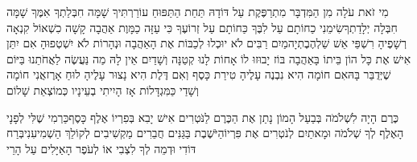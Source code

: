 \documentclass[../main/main.tex]{subfiles}
\begin{document}
\begin{multicols*}{\ncols}
מִי זֹאת עֹלָה מִן הַמִּדְבָּר מִתְרַפֶּקֶת עַל דּוֹדָהּ תַּחַת הַתַּפּוּחַ עוֹרַרְתִּיךָ שָׁמָּה חִבְּלַתְךָ אִמֶּךָ שָׁמָּה חִבְּלָה יְלָדַתְךָ\PreVerseSpace{}שִׂימֵנִי כַחוֹתָם עַל לִבֶּךָ כַּחוֹתָם עַל זְרוֹעֶךָ כִּי עַזָּה כַמָּוֶת אַהֲבָה קָשָׁה כִשְׁאוֹל קִנְאָה רְשָׁפֶיהָ רִשְׁפֵּי אֵשׁ שַׁלְהֶבֶתְיָה\PreVerseSpace{}מַיִם רַבִּים לֹא יוּכְלוּ לְכַבּוֹת אֶת הָאַהֲבָה וּנְהָרוֹת לֹא יִשְׁטְפוּהָ אִם יִתֵּן אִישׁ אֶת כָּל הוֹן בֵּיתוֹ בָּאַהֲבָה בּוֹז יָבוּזוּ לוֹ \ClosedSection{}אָחוֹת לָנוּ קְטַנָּה וְשָׁדַיִם אֵין לָהּ מַה נַּעֲשֶׂה לַאֲחֹתֵנוּ בַּיּוֹם שֶׁיְּדֻבַּר בָּהּ\PreVerseSpace{}אִם חוֹמָה הִיא נִבְנֶה עָלֶיהָ טִירַת כָּסֶף וְאִם דֶּלֶת הִיא נָצוּר עָלֶיהָ לוּחַ אָרֶז\PreVerseSpace{}אֲנִי חוֹמָה וְשָׁדַי כַּמִּגְדָּלוֹת אָז הָיִיתִי בְעֵינָיו כְּמוֹצְאֵת שָׁלוֹם\OpenSection{}\par
{}כֶּרֶם הָיָה לִשְׁלֹמֹה בְּבַעַל הָמוֹן נָתַן אֶת הַכֶּרֶם לַנֹּטְרִים אִישׁ יָבִא בְּפִרְיוֹ אֶלֶף כָּסֶף\PreVerseSpace{}כַּרְמִי שֶׁלִּי לְפָנָי הָאֶלֶף לְךָ שְׁלֹמֹה וּמָאתַיִם לְנֹטְרִים אֶת פִּרְיוֹ\PreVerseSpace{}הַיֹּשֶׁבֶת בַּגַּנִּים חֲבֵרִים מַקְשִׁיבִים לְקוֹלֵךְ הַשְׁמִיעִנִי\PreVerseSpace{}בְּרַח דּוֹדִי וּדְמֵה לְךָ לִצְבִי אוֹ לְעֹפֶר הָאַיָּלִים עַל הָרֵי\par
\end{multicols*}
\end{document}
